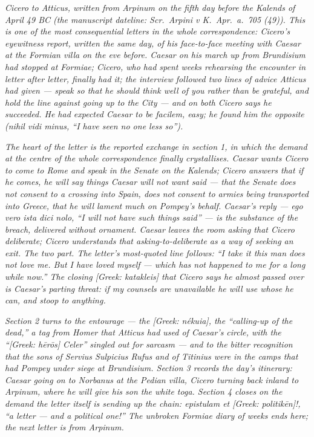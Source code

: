 
\textit{Cicero to Atticus, written from Arpinum on the
fifth day before the Kalends of April 49 BC (the
manuscript dateline: \textit{Scr.\ Arpini v K.\ Apr.\ a.\ 705
(49)}). This is one of the most consequential letters in
the whole correspondence: Cicero's eyewitness report,
written the same day, of his face-to-face meeting with
Caesar at the Formian villa on the eve before. Caesar
on his march up from Brundisium had stopped at Formiae;
Cicero, who had spent weeks rehearsing the encounter in
letter after letter, finally had it; the interview
followed two lines of advice Atticus had given --- speak
so that he should think well of you rather than be
grateful, and hold the line against going up to the
City --- and on both Cicero says he succeeded. He had
expected Caesar to be \textit{facilem}, easy; he found
him the opposite (\textit{nihil vidi minus}, ``I have
seen no one less so'').}

\textit{The heart of the letter is the reported exchange
in section 1, in which the demand at the centre of the
whole correspondence finally crystallises. Caesar wants
Cicero to come to Rome and speak in the Senate on the
Kalends; Cicero answers that if he comes, he will say
things Caesar will not want said --- that the Senate
does not consent to a crossing into Spain, does not
consent to armies being transported into Greece, that he
will lament much on Pompey's behalf. Caesar's reply ---
\textit{ego vero ista dici nolo}, ``I will not have such
things said'' --- is the substance of the breach,
delivered without ornament. Caesar leaves the room
asking that Cicero deliberate; Cicero understands that
asking-to-deliberate as a way of seeking an exit. The
two part. The letter's most-quoted line follows: ``I
take it this man does not love me. But I have loved
myself --- which has not happened to me for a long
while now.'' The closing \textit{[Greek: katakleis]}
that Cicero says he almost passed over is Caesar's
parting threat: if my counsels are unavailable he will
use whose he can, and stoop to anything.}

\textit{Section 2 turns to the entourage --- the
\textit{[Greek: n\'ekuia]}, the ``calling-up of the
dead,'' a tag from Homer that Atticus had used of
Caesar's circle, with the ``\textit{[Greek: h\=er\=os]}
Celer'' singled out for sarcasm --- and to the bitter
recognition that the sons of Servius Sulpicius Rufus
and of Titinius were in the camps that had Pompey under
siege at Brundisium. Section 3 records the day's
itinerary: Caesar going on to Norbanus at the Pedian
villa, Cicero turning back inland to Arpinum, where he
will give his son the white toga. Section 4 closes on
the demand the letter itself is sending up the chain:
\textit{epistulam et \textit{[Greek: politik\=en]}!},
``a letter --- and a political one!'' The unbroken
Formiae diary of weeks ends here; the next letter is
from Arpinum.}
